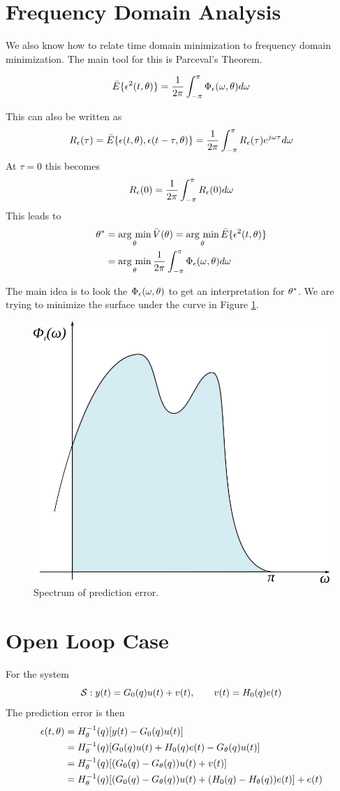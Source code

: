 \section{Frequency Domain Analysis}
We also know how to relate time domain minimization to frequency domain minimization. The main tool for this is Parceval's Theorem.
\begin{theorem}
$$\bar{E}\{\epsilon^2(t,\theta)\} = \frac{1}{2\pi}\int_{-\pi}^\pi \Phi_\epsilon(\omega,\theta)d\omega$$
\end{theorem}
This can also be written as
$$R_\epsilon(\tau) = \bar{E}\{\epsilon(t,\theta),\epsilon(t-\tau,\theta)\} = \frac{1}{2\pi}\int_{-\pi}^\pi R_\epsilon(\tau)e^{j\omega\tau}d\omega$$
At $\tau=0$ this becomes
$$R_\epsilon(0) = \frac{1}{2\pi}\int_{-\pi}^\pi R_\epsilon(0)d\omega$$
This leads to
\begin{align*}
\theta^\ast &= \mathop{\arg\,\min}\limits_\theta\bar{V}(\theta) = \mathop{\arg\,\min}\limits_\theta\bar{E}\{\epsilon^2(t,\theta)\} \\
&= \mathop{\arg\,\min}\limits_\theta\frac{1}{2\pi}\int_{-\pi}^\pi \Phi_\epsilon(\omega,\theta)d\omega
\end{align*}

The main idea is to look the $\Phi_\epsilon(\omega,\theta)$ to get an interpretation for $\theta^\ast$. We are trying to minimize the surface under the curve in Figure \ref{fig:16spec}.

\begin{figure}[ht!]
	\centering
	\includegraphics[width=.3\textwidth]{images/16spec}
	\caption{Spectrum of prediction error.}
	\label{fig:16spec}
\end{figure}

\section{Open Loop Case}
For the system
$$\mathcal{S}: y(t) = G_0(q) u(t) + v(t), \qquad v(t) = H_0(q) e(t)$$
The prediction error is then
\begin{align}
\epsilon(t,\theta) &= H_\theta^{-1}(q)[y(t)-G_0(q) u(t)] \nonumber \\
&= H_\theta^{-1}(q)[G_0(q) u(t)+H_0(q) e(t)-G_\theta(q) u(t)] \nonumber \\
\label{eq:16e1}
&= H_\theta^{-1}(q)[(G_0(q)-G_\theta(q))u(t)+v(t)] \\
\label{eq:16e2}
&= H_\theta^{-1}(q) [ (G_0(q) - G_\theta(q)) u(t) + (H_0(q) - H_\theta(q)) e(t) ] + e(t)
\end{align}


